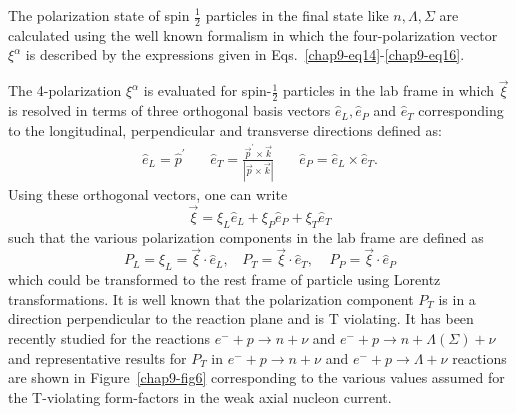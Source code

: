 The polarization state of spin $\frac{1}{2}$ particles in the final state like $n,\Lambda,\Sigma$ are calculated using the well known formalism in which the four-polari\-zation vector $\xi^\alpha$ is described by the expressions given in Eqs.~\ref{chap9-eq14}-\ref{chap9-eq16}.
   

The 4-polarization $\xi^\alpha$ is evaluated for spin-$\frac12$ particles in the lab frame in which $\vec{\xi}$ is resolved in  terms of three orthogonal basis vectors $\hat{e}_L,\hat{e}_P$ and $\hat{e}_T$ corresponding to the longitudinal, perpendicular and transverse directions defined as:
\begin{eqnarray}
\hat{e}_L= \hat{p}^\prime ~~~~~~~~ \hat{e}_T=\frac{\vec{p}^\prime\times \vec{k}}{|\vec{p}\times\vec{k}|}~~~~~~~~\hat{e}_P=\hat{e}_L\times\hat{e}_T. \label{chap9-eq41}
\end{eqnarray}
Using these orthogonal vectors, one can write
\begin{equation}
\vec{\xi}=\xi_L\hat{e}_L+\xi_P\hat{e}_P+\xi_T\hat{e}_T \label{chap9-eq42}
\end{equation}
such that the various polarization components in the lab frame are defined as 
\begin{equation}
P_{L}= \xi_L =\vec{\xi}\cdot \hat{e}_L,~~~~P_T=\vec{\xi}\cdot \hat{e}_T,~~~~~P_P=\vec{\xi}\cdot \hat{e}_P \label{chap9-eq43}
\end{equation} 
which could be transformed to the rest frame of particle using Lorentz transformations. It is well known that the polarization component $P_T$ is in a direction perpendicular to the reaction plane and is T violating. It has been recently studied \cite{chap9-key14} for the reactions $e^-+p\rightarrow n+\nu$ and $e^-+p\rightarrow n+\Lambda(\Sigma)+\nu$ and  representative results for $P_T$ in $e^-+p\rightarrow n+\nu$ and $e^-+p\rightarrow \Lambda+\nu$ reactions are shown in Figure~\ref{chap9-fig6} corresponding to the various values assumed for the T-violating form-factors in the weak axial nucleon current. 

